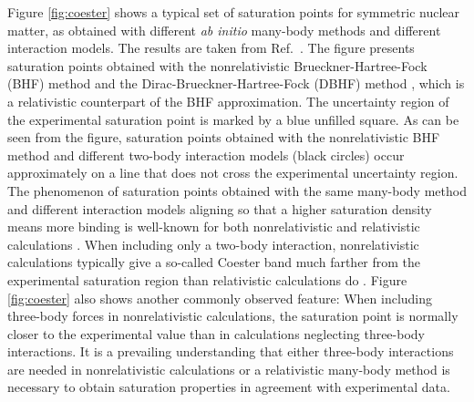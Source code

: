 \documentclass[a4paper,12pt]{report}
\begin{document}
Figure \ref{fig:coester} shows a typical set of saturation
points for symmetric nuclear matter, as obtained with 
different \emph{ab initio} many-body methods and different
interaction models. The results are taken from 
Ref.~\cite{li2006}. The figure presents saturation points 
obtained with the nonrelativistic Brueckner-Hartree-Fock 
(BHF) method \cite{brueckner1954,brueckner_gammel,bethe1971,
day1978,haftel_tabakin,mahaux1985,mahaux1989} and the 
Dirac-Brueckner-Hartree-Fock (DBHF) method 
\cite{anastasio1983,brockmann1984,horowitz1984,haar1987,
horowitz1987,brockmann1990}, which is 
a relativistic counterpart of the BHF approximation.
The uncertainty region of the experimental saturation 
point is marked by a blue unfilled square. As can be seen from the 
figure, saturation points obtained with the 
nonrelativistic BHF method and different two-body
interaction models (black circles) occur approximately on a 
line that does not cross the experimental uncertainty region. 
The phenomenon of saturation points obtained with
the same many-body method and different interaction
models aligning so that a higher saturation density 
means more binding is well-known for both 
nonrelativistic \cite{coester1970} 
and relativistic calculations \cite{fuchs2004}.
When including only a two-body interaction, 
nonrelativistic calculations typically give a so-called 
Coester band much farther from the experimental saturation 
region than relativistic calculations do \cite{fuchs2004}.
Figure \ref{fig:coester} also shows another commonly
observed feature:
When including three-body forces in nonrelativistic 
calculations, the saturation point is normally closer
to the experimental value than in calculations neglecting
three-body interactions. It is a prevailing understanding 
\cite{fuchs2004,hammer2013} that either three-body interactions 
are needed in nonrelativistic calculations or a relativistic 
many-body method is necessary to obtain saturation properties
in agreement with experimental data. 
\end{document}
